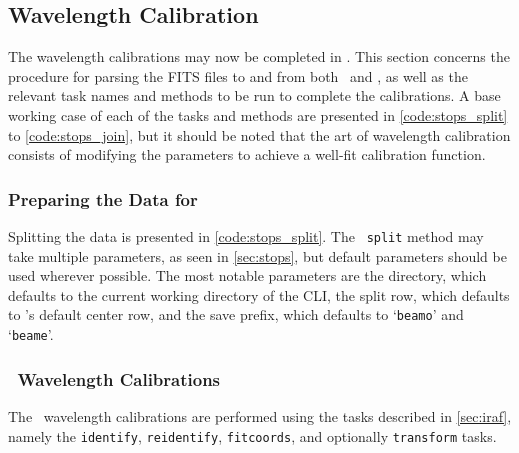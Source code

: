 \subsection{Wavelength Calibration} \label{subsec:reduc_wav}

The wavelength calibrations may now be completed in \iraf.
This section concerns the procedure for parsing the \gls{FITS} files to and from both \iraf\ and \polsalt, as well as the relevant task names and methods to be run to complete the calibrations.
A base working case of each of the tasks and methods are presented in \autoref{code:stops_split} to \ref{code:stops_join}, but it should be noted that the art of wavelength calibration consists of modifying the parameters to achieve a well-fit calibration function.%

\subsubsection{Preparing the Data for \iraf}

Splitting the data is presented in \autoref{code:stops_split}.
The \stops\ \texttt{split} method may take multiple parameters, as seen in \autoref{sec:stops}, but default parameters should be used wherever possible.
The most notable parameters are the directory, which defaults to the current working directory of the \gls{CLI}, the split row, which defaults to \polsalt's default center row, and the save prefix, which defaults to `\texttt{beamo}' and `\texttt{beame}'.

\subsubsection{\iraf\ Wavelength Calibrations}

The \iraf\ wavelength calibrations are performed using the tasks described in \autoref{sec:iraf}, namely the \texttt{identify}, \texttt{reidentify}, \texttt{fitcoords}, and optionally \texttt{transform} tasks.

